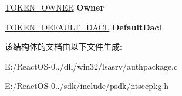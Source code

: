 \begin{DoxyCompactItemize}
\item 
\mbox{\label{struct___l_s_a___t_o_k_e_n___i_n_f_o_r_m_a_t_i_o_n___v1_acb125099d72f88a7afad0698e755efd1}} 
\hyperlink{struct___t_o_k_e_n___o_w_n_e_r}{T\+O\+K\+E\+N\+\_\+\+O\+W\+N\+ER} {\bfseries Owner}
\item 
\mbox{\label{struct___l_s_a___t_o_k_e_n___i_n_f_o_r_m_a_t_i_o_n___v1_a826d51137364e2117cda2aa96b122502}} 
\hyperlink{struct___t_o_k_e_n___d_e_f_a_u_l_t___d_a_c_l}{T\+O\+K\+E\+N\+\_\+\+D\+E\+F\+A\+U\+L\+T\+\_\+\+D\+A\+CL} {\bfseries Default\+Dacl}
\end{DoxyCompactItemize}


该结构体的文档由以下文件生成\+:\begin{DoxyCompactItemize}
\item 
E\+:/\+React\+O\+S-\/0../dll/win32/lsasrv/authpackage.\+c\item 
E\+:/\+React\+O\+S-\/0../sdk/include/psdk/ntsecpkg.\+h\end{DoxyCompactItemize}
